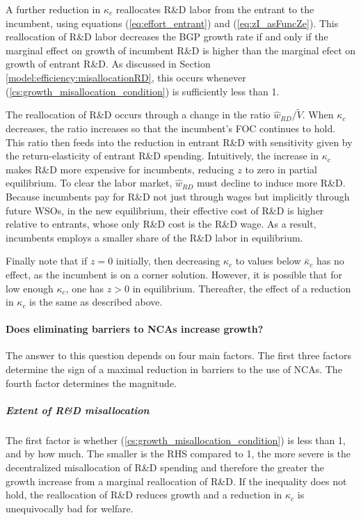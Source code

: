 \documentclass[11pt,english]{article}
\begin{document}
A further reduction in $\kappa_c$ reallocates R\&D labor from the entrant to the incumbent, using equations (\ref{eq:effort_entrant}) and (\ref{eq:zI_asFuncZe}). This reallocation of R\&D labor decreases the BGP growth rate if and only if the marginal effect on growth of incumbent R\&D is higher than the marginal efect on growth of entrant R\&D. As discussed in Section \ref{model:efficiency:misallocationRD}, this occurs whenever (\ref{cs:growth_misallocation_condition}) is sufficiently less than 1. 

The reallocation of R\&D occurs through a change in the ratio $\hat{w}_{RD} / \tilde{V}$. When $\kappa_c$ decreases, the ratio increases so that the incumbent's FOC continues to hold. This ratio then feeds into the reduction in entrant R\&D with sensitivity given by the return-elasticity of entrant R\&D spending. Intuitively, the increase in $\kappa_c$ makes R\&D more expensive for incumbents, reducing $z$ to zero in partial equilibrium. To clear the labor market, $\hat{w}_{RD}$ must decline to induce more R\&D. Because incumbents pay for R\&D not just through wages but implicitly through future WSOs, in the new equilibrium, their effective cost of R\&D is higher relative to entrants, whose only R\&D cost is the R\&D wage. As a result, incumbents employs a smaller share of the R\&D labor in equilibrium.

Finally note that if $z = 0$ initially, then decreasing $\kappa_{c}$ to values below $\bar{\kappa}_c$ has no effect, as the incumbent is on a corner solution. However, it is possible that for low enough $\kappa_c$, one has $z > 0$ in equilibrium. Thereafter, the effect of a reduction in $\kappa_c$ is the same as described above.

\paragraph{Does eliminating barriers to NCAs increase growth?}

The answer to this question depends on four main factors. The first three factors determine the sign of a maximal reduction in barriers to the use of NCAs. The fourth factor determines the magnitude.

\subparagraph{Extent of R\&D misallocation} The first factor is whether (\ref{cs:growth_misallocation_condition}) is less than 1, and by how much. The smaller is the RHS compared to 1, the more severe is the decentralized misallocation of R\&D spending and therefore the greater the growth increase from a marginal reallocation of R\&D. If the inequality does not hold, the reallocation of R\&D reduces growth and a reduction in $\kappa_c$ is unequivocally bad for welfare. 
\end{document}
